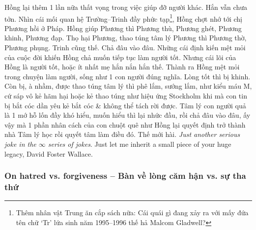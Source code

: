 \documentclass[12pt]{article}
\begin{document}
Hồng lại thêm 1 lần nữa thất vọng trong việc giúp đỡ người khác. Hắn vẫn chưa tởn. Nhìn cái mối quan hệ Trường--Trinh đầy phức tạp\footnote{Thêm nhân vật Trung ăn cắp sách nữa: Cái quái gì đang xảy ra với mấy đứa tên chữ `Tr' lứa sinh năm 1995--1996 thế hả {\sc Malcom Gladwell}?}, Hồng chợt nhớ tới chị Phương hồi ở Pháp. Hồng giúp Phương thì Phương thù, Phương ghét, Phương khinh, Phương đạp. Thọ hại Phương, thao túng tâm lý Phương thì Phương thờ, Phương phụng. Trinh cũng thế. Chả đâu vào đâu. Những cái định kiến mệt mỏi của cuộc đời khiến Hồng chả muốn tiếp tục làm người tốt. Nhưng cái lõi của Hồng là người tốt, hoặc ít nhất mẹ hắn nắn hắn thế. Thành ra Hồng mệt mỏi trong chuyện làm người, sống như 1 con người đúng nghĩa. Lòng tốt thì bị khinh. Còn bị, à nhầm, được thao túng tâm lý thì phê lắm, sướng lắm, như kiểu máu M, cứ sáp vô kẻ hãm hại hoặc kẻ thao túng như hiệu ứng Stockholm khi mà con tin bị bắt cóc dần yêu kẻ bắt cóc \& không thể tách rời được. Tâm lý con người quả là 1 mớ hỗ lốn đầy khó hiểu, muốn hiểu thì lại nhức đầu, rồi chả đâu vào đâu, ấy vậy mà 1 phần nhân cách của con chuột quê như Hồng lại quyết định trở thành nhà Tâm lý học rồi quyết tâm làm điều đó. Thế mới hài. {\it Just another serious joke in the $\infty$ series of jokes}. Just let me inherit a small piece of your huge legacy, {\sc David Foster Wallace}.

\subsubsection{On hatred vs. forgiveness -- Bàn về lòng căm hận vs. sự tha thứ}
\end{document}

